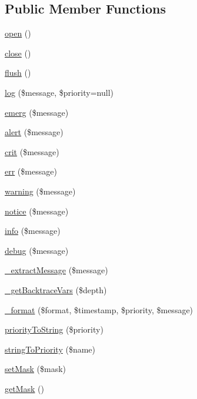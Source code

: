 \subsection*{Public Member Functions}
\begin{DoxyCompactItemize}
\item 
\hyperlink{class_log_a44a2ac59a3b91f8c18905dce700934d6}{open} ()
\item 
\hyperlink{class_log_aa69c8bf1f1dcf4e72552efff1fe3e87e}{close} ()
\item 
\hyperlink{class_log_a7751f77b5263bcf940ece6e824a05b38}{flush} ()
\item 
\hyperlink{class_log_ac3758dfa38a67df158a446847cf06413}{log} (\$message, \$priority=null)
\item 
\hyperlink{class_log_a7627472a502d6e878582e1e04d32064a}{emerg} (\$message)
\item 
\hyperlink{class_log_af13c49745ed34d011f658cfdc228d918}{alert} (\$message)
\item 
\hyperlink{class_log_a55fe6e0b19208d301c2798bde6b4e528}{crit} (\$message)
\item 
\hyperlink{class_log_aef62f26738cfaf8ac15d7b0011abea7c}{err} (\$message)
\item 
\hyperlink{class_log_ae005667f1ec6a4131a00a165d7ad1c35}{warning} (\$message)
\item 
\hyperlink{class_log_a4b6e453a50f7f0811f169689512c468f}{notice} (\$message)
\item 
\hyperlink{class_log_adfa8ba1d05a27351e0d97169d98bb9cf}{info} (\$message)
\item 
\hyperlink{class_log_a568d49c8c4f47314610017c56d159482}{debug} (\$message)
\item 
\hyperlink{class_log_a098b1ce5aa94a107bf515ee3d85477de}{\_\-extractMessage} (\$message)
\item 
\hyperlink{class_log_a44bcba9917f3bdc79772e3e837f70212}{\_\-getBacktraceVars} (\$depth)
\item 
\hyperlink{class_log_a2e151ba12b4d5ad6b5c4cbd87fd32b44}{\_\-format} (\$format, \$timestamp, \$priority, \$message)
\item 
\hyperlink{class_log_a2c332d68b59c851233d457f81461297d}{priorityToString} (\$priority)
\item 
\hyperlink{class_log_aacc513ea43803a6b0f361a19bea616a4}{stringToPriority} (\$name)
\item 
\hyperlink{class_log_acba3747f8f23e282e0618554a62eb212}{setMask} (\$mask)
\item 
\hyperlink{class_log_a8c55a3808b6789fb354a53f4fa59e1c8}{getMask} ()

\end{DoxyCompactItemize}
